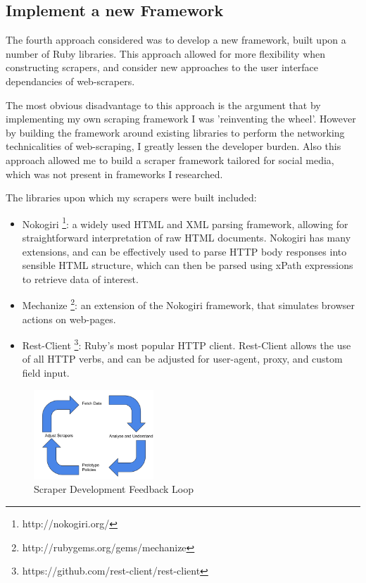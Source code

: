 \subsection{Implement a new Framework}

The fourth approach considered was to develop a new framework, built upon a number of Ruby libraries. This approach allowed for more flexibility when constructing scrapers, and consider new approaches to the user interface dependancies of web-scrapers. 

The most obvious disadvantage to this approach is the argument that by implementing my own scraping framework I was 'reinventing the wheel'. However by building the framework around existing libraries to perform the networking technicalities of web-scraping, I greatly lessen the developer burden. Also this approach allowed me to build a scraper framework tailored for social media, which was not present in frameworks I researched. 



The libraries upon which my scrapers were built included:

\begin{itemize}
 \item Nokogiri \footnote{http://nokogiri.org/}: a widely used HTML and XML parsing framework, allowing for straightforward interpretation of raw HTML documents. Nokogiri has many extensions, and can be effectively used to parse HTTP body responses into sensible HTML structure, which can then be parsed using xPath expressions to retrieve data of interest.
 \item Mechanize \footnote{http://rubygems.org/gems/mechanize}: an extension of the Nokogiri framework, that simulates browser actions on web-pages. 
 \item Rest-Client \footnote{https://github.com/rest-client/rest-client}: Ruby's most popular HTTP client. Rest-Client allows the use of all HTTP verbs, and can be adjusted for user-agent, proxy, and custom field input.
\end{itemize}




\begin{figure}[h!]
\centering
\includegraphics[width=0.4\textwidth]{Images/Implementation_Lifecycle.pdf}
\caption{Scraper Development Feedback Loop}
\end{figure}

